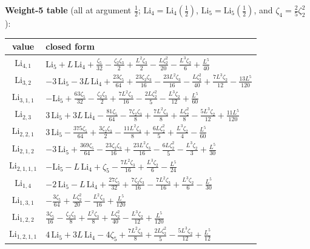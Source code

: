 \documentclass[11pt]{article}
\theoremstyle{remark}
\begin{document}
\textbf{Weight-5 table} (all at argument $\tfrac12$; $\mathrm{Li}_4=\mathrm{Li}_4(\tfrac12)$, $\mathrm{Li}_5=\mathrm{Li}_5(\tfrac12)$, and $\zeta_4=\tfrac25\zeta_2^2$):

\begin{center}\small
\renewcommand{\arraystretch}{1.5}
\begin{tabular}{|c|l|}
\hline
value & closed form\\
\hline
$\mathrm{Li}_{4,1}$ & $\mathrm{Li}_5+L\,\mathrm{Li}_4+\tfrac{\zeta_5}{32}-\tfrac{\zeta_2\zeta_3}2+\tfrac{L^2\zeta_3}2-\tfrac{L\zeta_2^2}{20}-\tfrac{L^3\zeta_2}6+\tfrac{L^5}{40}$\\
$\mathrm{Li}_{3,2}$ & $-3\,\mathrm{Li}_5-3L\,\mathrm{Li}_4+\tfrac{23\zeta_5}{64}+\tfrac{23\zeta_2\zeta_3}{16}-\tfrac{23L^2\zeta_3}{16}-\tfrac{L\zeta_2^2}{40}+\tfrac{7L^3\zeta_2}{12}-\tfrac{13L^5}{120}$\\
$\mathrm{Li}_{3,1,1}$ & $-\mathrm{Li}_5+\tfrac{63\zeta_5}{32}-\tfrac{\zeta_2\zeta_3}2+\tfrac{7L^2\zeta_3}{16}-\tfrac{2L\zeta_2^2}5-\tfrac{L^3\zeta_2}{12}+\tfrac{L^5}{60}$\\
$\mathrm{Li}_{2,3}$ & $3\,\mathrm{Li}_5+3L\,\mathrm{Li}_4-\tfrac{81\zeta_5}{64}-\tfrac{7\zeta_2\zeta_3}8+\tfrac{7L^2\zeta_3}8+\tfrac{L\zeta_2^2}8-\tfrac{5L^3\zeta_2}{12}+\tfrac{11L^5}{120}$\\
$\mathrm{Li}_{2,2,1}$ & $3\,\mathrm{Li}_5-\tfrac{375\zeta_5}{64}+\tfrac{3\zeta_2\zeta_3}2-\tfrac{11L^2\zeta_3}8+\tfrac{6L\zeta_2^2}5+\tfrac{L^3\zeta_2}4-\tfrac{L^5}{60}$\\
$\mathrm{Li}_{2,1,2}$ & $-3\,\mathrm{Li}_5+\tfrac{369\zeta_5}{64}-\tfrac{23\zeta_2\zeta_3}{16}+\tfrac{23L^2\zeta_3}{16}-\tfrac{6L\zeta_2^2}5-\tfrac{L^3\zeta_2}3+\tfrac{L^5}{30}$\\
$\mathrm{Li}_{2,1,1,1}$ & $-\mathrm{Li}_5-L\,\mathrm{Li}_4+\zeta_5-\tfrac{7L^2\zeta_3}{16}+\tfrac{L^3\zeta_2}6-\tfrac{L^5}{24}$\\
$\mathrm{Li}_{1,4}$ & $-2\,\mathrm{Li}_5-L\,\mathrm{Li}_4+\tfrac{27\zeta_5}{32}+\tfrac{7\zeta_2\zeta_3}{16}-\tfrac{7L^2\zeta_3}{16}+\tfrac{L^3\zeta_2}6-\tfrac{L^5}{30}$\\
$\mathrm{Li}_{1,3,1}$ & $-\tfrac{3\zeta_5}{64}+\tfrac{L\zeta_2^2}{20}-\tfrac{L^2\zeta_3}{16}+\tfrac{L^5}{120}$\\
$\mathrm{Li}_{1,2,2}$ & $\tfrac{3\zeta_5}{16}-\tfrac{\zeta_2\zeta_3}8+\tfrac{L^2\zeta_3}8+\tfrac{L\zeta_2^2}{40}-\tfrac{L^3\zeta_2}{12}+\tfrac{L^5}{120}$\\
$\mathrm{Li}_{1,2,1,1}$ & $4\,\mathrm{Li}_5+3L\,\mathrm{Li}_4-4\zeta_5+\tfrac{7L^2\zeta_3}8+\tfrac{2L\zeta_2^2}5-\tfrac{5L^3\zeta_2}{12}+\tfrac{L^5}{12}$\\

\end{tabular}
\end{center}
\end{document}
